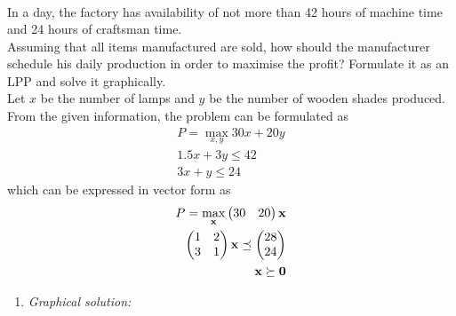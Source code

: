 \documentclass[journal,12pt,twocolumn]{IEEEtran}
\renewcommand\thesection{\arabic{section}}
\begin{document}
\begin{enumerate}[label=\thesection.\arabic*.,ref=\thesection.\theenumi]
\begin{table}[htb]
{\begin{tabular}{|c|c|c|c|}
\end{tabular}
}
\caption{}
\end{table}
In a day, the factory has availability of not more than 42 hours of machine time and 24 hours of craftsman time.\\
Assuming that all items manufactured are sold, how should the manufacturer schedule his daily production in order to maximise the profit? Formulate it as an LPP and solve it graphically.\\
\solution Let $x$ be the number of lamps and $y$ be the number of wooden shades produced.  From the given information, the problem can be formulated as
\begin{align}
	P = \max_{x,y}30x+20y
	\\
1.5x+3y \le 42
\\
3x+y \le 24
\end{align}
which can be expressed in vector form as
\begin{align}
	P = \max_{\mathbf{x}}\begin{pmatrix}30 &20\end{pmatrix}\mathbf{x}
	\\
	\begin{pmatrix}1 &2 \\ 3 & 1\end{pmatrix} \mathbf{x}\preceq \begin{pmatrix}28 \\ 24\end{pmatrix}
	\\
	\mathbf{x} \succeq \mathbf{0}
\end{align}
		\begin{enumerate}
			\item {\em Graphical solution:} 


\end{enumerate}
\end{enumerate}
\end{document}
